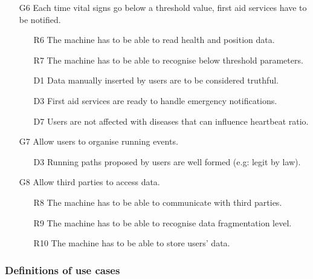 \documentclass{article}
\begin{document}
\begin{itemize}
	\item [G6] Each time vital signs go below a threshold value, first 
	aid services have to be notified.
	\begin{itemize}
		\item [R6] The machine has to be able to read health and 
		position data. 
		\item [R7] The machine has to be able to recognise below 
		threshold parameters.
		\item [D1] Data manually inserted by users are to be considered truthful.
		\item [D3] First aid services are ready to handle emergency
		notiﬁcations.
		\item [D7]Users are not affected with diseases that can 
		influence heartbeat ratio.
	\end{itemize}
		
	\item [G7] Allow users to organise running events.
	\begin{itemize}
		\item [D3] Running paths proposed by users are well formed 
		(e.g: legit by law). 
	\end{itemize}
	
	\item [G8] Allow third parties to access data.
	\begin{itemize}
		\item [R8] The machine has to be able to communicate with 
		third parties. 
		\item [R9] The machine has to be able to recognise data 
		fragmentation level.
		\item [R10] The machine has to be able to store users’ data.
	\end{itemize}
	
\end{itemize}

\newpage
\subsubsection{Definitions of use cases}
\end{document}
